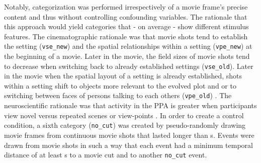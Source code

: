 \documentclass[english]{article}
\begin{document}
Notably, categorization was performed irrespectively of a movie frame's precise
content and thus without controlling confounding variables.
The rationale that this approach would yield categories that - on average - show
different stimulus features.
The cinematographic rationale was that movie shots tend to establish the setting
(\texttt{vse\_new}) and the spatial relationships within a setting
(\texttt{vpe\_new}) at the beginning of a movie.
Later in the movie, the field sizes of movie shots tend to decrease when
switching back to already established settings (\texttt{vse\_old}).
Later in the movie when the spatial layout of a setting is already established,
shots within a setting shift to objects more relevant to the evolved plot and or
to switching between faces of persons talking to each others (\texttt{vpe\_old})
\citep{brown2012cinematography, mercado2011filmmakers}.
The neuroscientific rationale was that activity in the PPA is greater when
participants view novel versus repeated scenes or view-points
\citep{epstein1999parahippocampal, grill2006repetition}.
In order to create a control condition, a sixth category (\texttt{no\_cut}) was
created by pseudo-randomly drawing movie frames from continuous movie shots that
lasted longer than \unit[20]{s}.
Events were drawn from movie shots in such a way that each event had a minimum
temporal distance of at least \unit[10]{s} to a movie cut and to another
\texttt{no\_cut} event.
\end{document}
